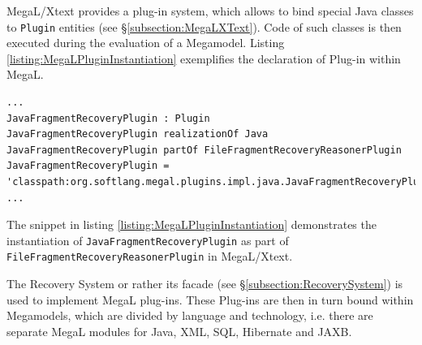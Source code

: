 \gls{MegaL/Xtext} provides a plug-in system, which allows to bind special \gls{Java} classes to \texttt{Plugin} entities (see §\ref{subsection:MegaLXText}).
Code of such classes is then executed during the evaluation of a \gls{Megamodel}.
Listing \ref{listing:MegaLPluginInstantiation} exemplifies the declaration of Plug-in within \gls{MegaL}.
\begin{lstlisting}[caption={MegaL/Xtext Plugin Integration},label={listing:MegaLPluginInstantiation}]
...
JavaFragmentRecoveryPlugin : Plugin
JavaFragmentRecoveryPlugin realizationOf Java
JavaFragmentRecoveryPlugin partOf FileFragmentRecoveryReasonerPlugin
JavaFragmentRecoveryPlugin = 'classpath:org.softlang.megal.plugins.impl.java.JavaFragmentRecoveryPlugin'
...
\end{lstlisting}
The snippet in listing \ref{listing:MegaLPluginInstantiation} demonstrates the instantiation of \texttt{Java\-Frag\-ment\-Re\-co\-very\-Plug\-in} as part of \texttt{File\-Fragment\-Recovery\-Reasoner\-Plugin} in \gls{MegaL/Xtext}.


The Recovery System or rather its facade (see §\ref{subsection:RecoverySystem}) is used to implement \gls{MegaL} plug-ins.
These Plug-ins are then in turn bound within \glspl{Megamodel}, which are divided by language and technology, i.e. there are separate \gls{MegaL} modules for \gls{Java}, \gls{XML}, \gls{SQL}, \gls{Hibernate} and \gls{JAXB}.
